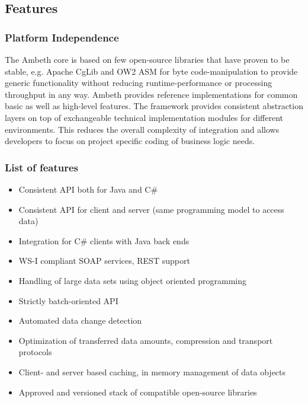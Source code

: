 \subsection{Features}
\subsubsection{Platform Independence}

The Ambeth core is based on few open-source libraries that have proven to be stable, e.g. Apache CgLib and OW2 ASM for byte code-manipulation to provide generic functionality without reducing runtime-performance or processing throughput in any way. Ambeth provides reference implementations for common basic as well as high-level features. The framework provides consistent abstraction layers on top of exchangeable technical implementation modules for different environments. This reduces the overall complexity of integration and allows developers to focus on project specific coding of  business logic needs.

\subsubsection{List of features}

\begin{itemize}
	\item Consistent API both for Java and C\#
	\item Consistent API for client and server (same programming model to access data)
	\item Integration for C\# clients with Java back ends
	\item WS-I compliant SOAP services, REST support
	\item Handling of large data sets using object oriented programming
	\item Strictly batch-oriented API
	\item Automated data change detection
	\item Optimization of transferred data amounts, compression and transport protocols
	\item Client- and server based caching, in memory management of data objects
	\item Approved and versioned stack of compatible open-source libraries
\end{itemize}


